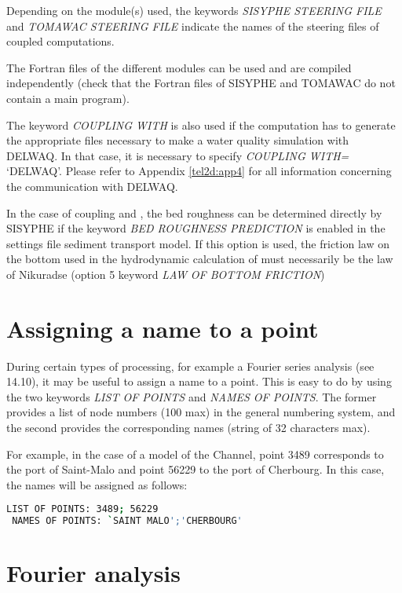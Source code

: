  Depending on the module(s) used, the keywords \textit{SISYPHE STEERING FILE }and\textit{ TOMAWAC STEERING FILE} indicate the names of the steering files of coupled computations.

 The Fortran files of the different modules can be used and are compiled independently (check that the Fortran files of SISYPHE and TOMAWAC do not contain a main program).

 The keyword \textit{COUPLING WITH} is also used if the computation has to generate the appropriate files necessary to make a water quality simulation with DELWAQ. In that case, it is necessary to specify \textit{COUPLING WITH= }`DELWAQ'. Please refer to Appendix \ref{tel2d:app4} for all information concerning the communication with DELWAQ.

 In the case of coupling  and \sisyphe, the bed roughness can be determined directly by SISYPHE if the keyword \textit{BED ROUGHNESS PREDICTION }is enabled in the settings file sediment transport model. If this option is used, the friction law on the bottom used in the hydrodynamic calculation of  must necessarily be the law of Nikuradse (option 5 keyword \textit{LAW OF BOTTOM FRICTION})


\section{ Assigning a name to a point}

 During certain types of processing, for example a Fourier series analysis (see 14.10), it may be useful to assign a name to a point. This is easy to do by using the two keywords \textit{LIST OF POINTS} and \textit{NAMES OF POINTS}. The former provides a list of node numbers (100 max) in the general numbering system, and the second provides the corresponding names (string of 32 characters max).

 For example, in the case of a model of the Channel, point 3489 corresponds to the port of Saint-Malo and point 56229 to the port of Cherbourg. In this case, the names will be assigned as follows:
\begin{lstlisting}[language=bash]
 LIST OF POINTS: 3489; 56229
 NAMES OF POINTS: `SAINT MALO';'CHERBOURG'
\end{lstlisting}

\section{ Fourier analysis}


